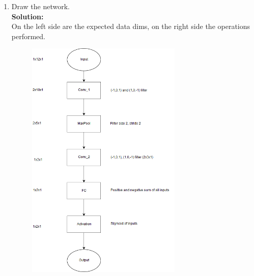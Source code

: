 \documentclass[a4paper]{article}
\begin{document}
\begin{enumerate}
\begin{enumerate}
	\item Draw the network.\\
	\textbf{Solution:}\\
	
	On the left side are the expected data dims, on the right side the operations performed.
	\begin{figure}[H]
	\centering
  	\includegraphics[width=0.7\textwidth]{images/CNN_ex_1.png}
	\end{figure}
	
	
	

\end{enumerate}
\end{enumerate}
\end{document}
